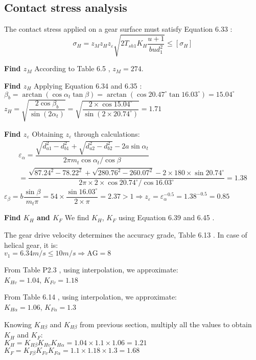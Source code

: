 \subsection{Contact stress analysis}
The contact stress applied on a gear surface must satisfy Equation 6.33 \cite{tk1}:
\[
\sigma_H = z_Mz_Hz_\varepsilon\sqrt{2T_{sh1}K_H\dfrac{u+1}{bud_1^2}} \leq [\sigma_H]
\]

\textbf{Find $ z_M $} According to Table 6.5 \cite{tk1}, $ z_M = 274 $.

\textbf{Find $ z_H $} Applying Equation 6.34 \cite{tk1} and 6.35 \cite{tk1}:\\
$ \beta_b = \arctan\left( \cos\alpha_t\tan\beta\right) = \arctan\left( \cos 20.47^\circ\tan 16.03^\circ\right) = 15.04^\circ$\\
$ z_H = \sqrt{\dfrac{2\cos\beta_b}{\sin(2\alpha_t)}} = \sqrt{\dfrac{2\times\cos 15.04^\circ}{\sin(2\times 20.74^\circ)}} = 1.71$

\textbf{Find $ z_\varepsilon $} Obtaining $ z_\varepsilon $ through calculations:
\begin{multline*}
	\varepsilon_\alpha = \dfrac{\sqrt{d_{a1}^2-d_{b1}^2}+\sqrt{d_{a2}^2-d_{b2}^2}-2a\sin\alpha_t}{2\pi m_t{\cos\alpha_t}/{\cos\beta}}\\
	 = \dfrac{\sqrt{87.24^2-78.22^2}+\sqrt{280.76^2-260.07^2}-2\times 180\times\sin 20.74^\circ}{2\pi \times 2\times{\cos 20.74^\circ}/{\cos 16.03^\circ}} = 1.38
\end{multline*}
$ \varepsilon_\beta = b\dfrac{\sin\beta}{m_t\pi} = 54\times\dfrac{\sin 16.03^\circ}{2\times\pi}=2.37 >1 \Rightarrow z_\varepsilon = \varepsilon_\alpha^{-0.5} = 1.38^{-0.5} = 0.85 $

\textbf{Find $ K_H $ and $ K_F $} We find $ K_H $, $ K_F $ using Equation 6.39 and 6.45 \cite{tk1}.

The gear drive velocity determines the accuracy grade, Table 6.13 \cite{tk1}. In case of helical gear, it is:\\
$ v_1=6.34 \unit{m/s} \leq 10 \unit{m/s}\Rightarrow \text{AG} = 8 $

From Table P2.3 \cite{tk1}, using interpolation, we approximate:\\
$ K_{Hv} = 1.04$, $ K_{Fv} = 1.18$

From Table 6.14 \cite{tk1}, using interpolation, we approximate:\\
$ K_{H\alpha} = 1.06$, $ K_{F\alpha} = 1.3 $

Knowing $ K_{H\beta} $ and $ K_{H\beta} $ from previous section, multiply all the values to obtain $ K_H $ and $ K_F $:\\
$ K_H = K_{H\beta}K_{Hv}K_{H\alpha} = 1.04\times 1.1 \times 1.06  = 1.21 $\\
$ K_F = K_{F\beta}K_{Fv}K_{F\alpha} = 1.1\times 1.18 \times 1.3 = 1.68 $

